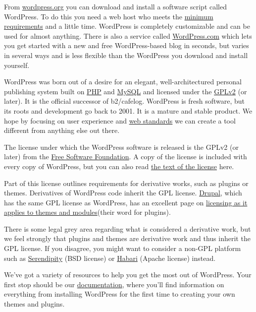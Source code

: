 From \url{wordpress.org} you can download and install a software script called WordPress. To do this you need a web host who meets the \href{http://wordpress.org/about/requirements/}{minimum requirements} and a little time. WordPress is completely customizable and can be used for almost anything. There is also a service called \href{http://wordpress.com/?ref=wporg-about}{WordPress.com} which lets you get started with a new and free WordPress-based blog in seconds, but varies in several ways and is less flexible than the WordPress you download and install yourself.

WordPress was born out of a desire for an elegant, well-architectured personal publishing system built on \href{http://php.net/}{PHP} and \href{http://mysql.com/}{MySQL} and licensed under the \href{http://www.gnu.org/copyleft/gpl.html}{GPLv2} (or later). It is the official successor of b2/cafelog. WordPress is fresh software, but its roots and development go back to 2001. It is a mature and stable product. We hope by focusing on user experience and \href{http://webstandards.org/}{web standards} we can create a tool different from anything else out there.

The license under which the WordPress software is released is the GPLv2 (or later) from the \href{http://www.fsf.org/}{Free Software Foundation}. A copy of the license is included with every copy of WordPress, but you can also read \href{http://wordpress.org/about/gpl/}{the text of the license} here.

Part of this license outlines requirements for derivative works, such as plugins or themes. Derivatives of WordPress code inherit the GPL license. \href{http://drupal.org/}{Drupal}, which has the same GPL license as WordPress, has an excellent page on \href{http://drupal.org/licensing/faq/}{licensing as it applies to themes and modules}(their word for plugins).

There is some legal grey area regarding what is considered a derivative work, but we feel strongly that plugins and themes are derivative work and thus inherit the GPL license. If you disagree, you might want to consider a non-GPL platform such as \href{http://www.s9y.org/}{Serendipity} (BSD license) or \href{http://habariproject.org/en/}{Habari} (Apache license) instead.

We've got a variety of resources to help you get the most out of WordPress. Your first stop should be our \href{http://codex.wordpress.org/}{documentation}, where you'll find information on everything from installing WordPress for the first time to creating your own themes and plugins.


